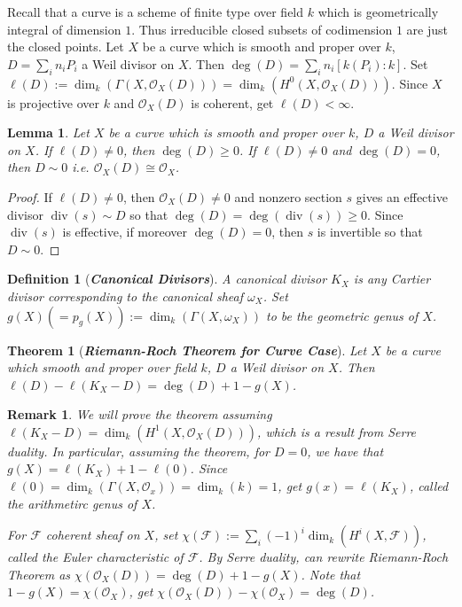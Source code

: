 \documentclass{ctexart}
\newtheorem{definition}{Definition}[section]
\newtheorem{remark}{Remark}[section]
\newtheorem{theorem}{Theorem}[section]
\newtheorem{lemma}{Lemma}[section]
\newcommand{\divisor}{\operatorname{div}}
\begin{document}
Recall that a curve is a scheme of finite type over field $k$ which is geometrically integral of dimension $1$.
Thus irreducible closed subsets of codimension $1$ are just the closed points.
Let $X$ be a curve which is smooth and proper over $k$, $D = \sum_{i} n_{i}P_{i}$ a Weil divisor on $X$.
Then $\deg(D) = \sum_{i} n_{i}[k(P_{i}) : k]$.
Set $\ell(D) := \dim_{k}(\Gamma(X, \mathcal{O}_{X}(D))) = \dim_{k}(H^{0}(X, \mathcal{O}_{X}(D)))$.
Since $X$ is projective over $k$ and $\mathcal{O}_{X}(D)$ is coherent, get $\ell(D) < \infty$.
\begin{lemma}
    Let $X$ be a curve which is smooth and proper over $k$, $D$ a Weil divisor on $X$.
    If $\ell(D) \neq 0$, then $\deg(D) \ge 0$.
    If $\ell(D) \neq 0$ and $\deg(D) = 0$, then $D \sim 0$ i.e. $\mathcal{O}_{X}(D) \cong \mathcal{O}_{X}$.
    \label{Lemma 8.3}
\end{lemma}
\begin{proof}
    If $\ell(D) \neq 0$, then $\mathcal{O}_{X}(D) \neq 0$ and nonzero section $s$ gives an effective divisor $\divisor (s) \sim D$ so that $\deg(D) = \deg(\divisor (s)) \ge 0$.
    Since $\divisor (s)$ is effective, if moreover $\deg(D) = 0$, then $s$ is invertible so that $D \sim 0$.
\end{proof}
\begin{definition}[\textbf{\emph{Canonical Divisors}}]
    A canonical divisor $K_{X}$ is any Cartier divisor corresponding to the canonical sheaf $\omega_{X}$.
    Set $g(X) (= p_{g}(X)) := \dim_{k}(\Gamma(X, \omega_{X}))$ to be the geometric genus of $X$.
\end{definition}
\begin{theorem}[\textbf{\emph{Riemann-Roch Theorem for Curve Case}}]
    Let $X$ be a curve which smooth and proper over field $k$, $D$ a Weil divisor on $X$.
    Then $\ell(D) - \ell(K_{X} - D) = \deg(D) + 1 - g(X)$.
    \label{Theorem 8.2}
\end{theorem}
\begin{remark}
    We will prove the theorem assuming $\ell(K_{X} - D) = \dim_{k}(H^{1}(X, \mathcal{O}_{X}(D)))$, which is a result from Serre duality.
    In particular, assuming the theorem, for $D = 0$, we have that $g(X) = \ell(K_{X}) + 1 - \ell(0)$.
    Since $\ell(0) = \dim_{k}(\Gamma(X, \mathcal{O}_{x})) = \dim_{k}(k) = 1$, get $g(x) = \ell(K_{X})$, called the arithmetirc genus of $X$.
    \par
    For $\mathcal{F}$ coherent sheaf on $X$, set $\chi(\mathcal{F}) := \sum_{i} (-1)^{i}\dim_{k}(H^{i}(X, \mathcal{F}))$, called the Euler characteristic of $\mathcal{F}$.
    By Serre duality, can rewrite Riemann-Roch Theorem as $\chi(\mathcal{O}_{X}(D)) = \deg(D) + 1 - g(X)$.
    Note that $1 - g(X) = \chi(\mathcal{O}_{X})$, get $\chi(\mathcal{O}_{X}(D)) - \chi(\mathcal{O}_{X}) = \deg(D)$.
\end{remark}
\end{document}
